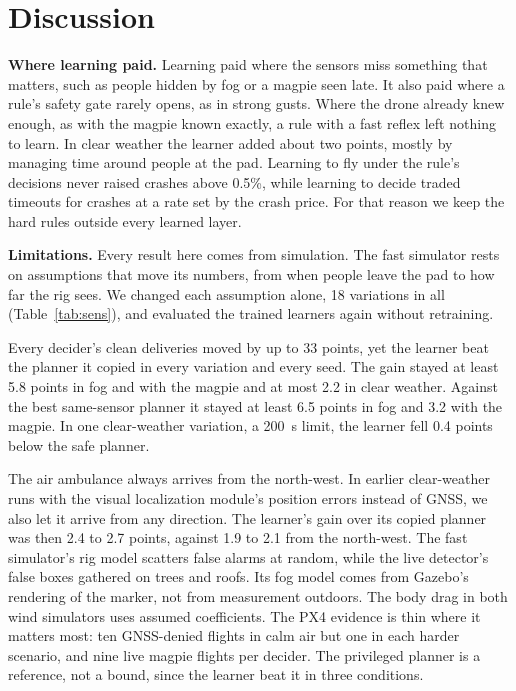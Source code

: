 \section{Discussion}

\textbf{Where learning paid.} Learning paid where the sensors miss something that matters, such as people hidden by fog or a magpie seen late. It also paid where a rule's safety gate rarely opens, as in strong gusts. Where the drone already knew enough, as with the magpie known exactly, a rule with a fast reflex left nothing to learn. In clear weather the learner added about two points, mostly by managing time around people at the pad. Learning to fly under the rule's decisions never raised crashes above 0.5\%, while learning to decide traded timeouts for crashes at a rate set by the crash price. For that reason we keep the hard rules outside every learned layer.



\textbf{Limitations.} Every result here comes from simulation. The fast simulator rests on assumptions that move its numbers, from when people leave the pad to how far the rig sees. We changed each assumption alone, 18 variations in all (Table~\ref{tab:sens}), and evaluated the trained learners again without retraining.

Every decider's clean deliveries moved by up to 33 points, yet the learner beat the planner it copied in every variation and every seed. The gain stayed at least 5.8 points in fog and with the magpie and at most 2.2 in clear weather. Against the best same-sensor planner it stayed at least 6.5 points in fog and 3.2 with the magpie. In one clear-weather variation, a 200~s limit, the learner fell 0.4 points below the safe planner.

The air ambulance always arrives from the north-west. In earlier clear-weather runs with the visual localization module's position errors instead of GNSS, we also let it arrive from any direction. The learner's gain over its copied planner was then 2.4 to 2.7 points, against 1.9 to 2.1 from the north-west. The fast simulator's rig model scatters false alarms at random, while the live detector's false boxes gathered on trees and roofs. Its fog model comes from Gazebo's rendering of the marker, not from measurement outdoors. The body drag in both wind simulators uses assumed coefficients. The PX4 evidence is thin where it matters most: ten GNSS-denied flights in calm air but one in each harder scenario, and nine live magpie flights per decider. The privileged planner is a reference, not a bound, since the learner beat it in three conditions.

